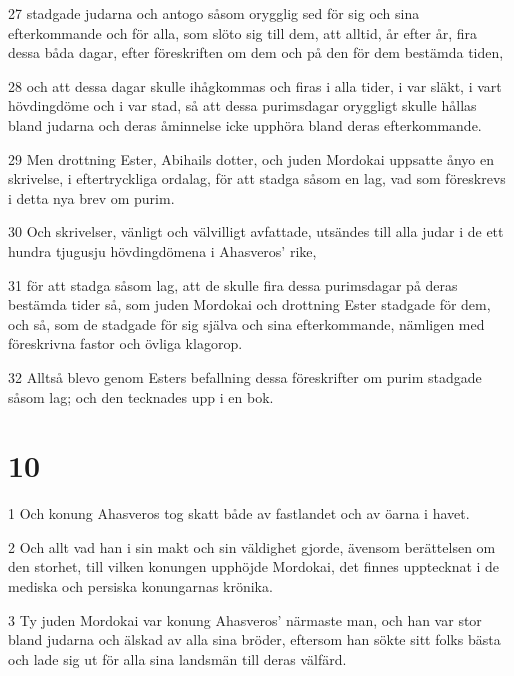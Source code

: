 \par 27 stadgade judarna och antogo såsom orygglig sed för sig och sina efterkommande och för alla, som slöto sig till dem, att alltid, år efter år, fira dessa båda dagar, efter föreskriften om dem och på den för dem bestämda tiden,
\par 28 och att dessa dagar skulle ihågkommas och firas i alla tider, i var släkt, i vart hövdingdöme och i var stad, så att dessa purimsdagar oryggligt skulle hållas bland judarna och deras åminnelse icke upphöra bland deras efterkommande.
\par 29 Men drottning Ester, Abihails dotter, och juden Mordokai uppsatte ånyo en skrivelse, i eftertryckliga ordalag, för att stadga såsom en lag, vad som föreskrevs i detta nya brev om purim.
\par 30 Och skrivelser, vänligt och välvilligt avfattade, utsändes till alla judar i de ett hundra tjugusju hövdingdömena i Ahasveros' rike,
\par 31 för att stadga såsom lag, att de skulle fira dessa purimsdagar på deras bestämda tider så, som juden Mordokai och drottning Ester stadgade för dem, och så, som de stadgade för sig själva och sina efterkommande, nämligen med föreskrivna fastor och övliga klagorop.
\par 32 Alltså blevo genom Esters befallning dessa föreskrifter om purim stadgade såsom lag; och den tecknades upp i en bok.

\chapter{10}

\par 1 Och konung Ahasveros tog skatt både av fastlandet och av öarna i havet.
\par 2 Och allt vad han i sin makt och sin väldighet gjorde, ävensom berättelsen om den storhet, till vilken konungen upphöjde Mordokai, det finnes upptecknat i de mediska och persiska konungarnas krönika.
\par 3 Ty juden Mordokai var konung Ahasveros' närmaste man, och han var stor bland judarna och älskad av alla sina bröder, eftersom han sökte sitt folks bästa och lade sig ut för alla sina landsmän till deras välfärd.



